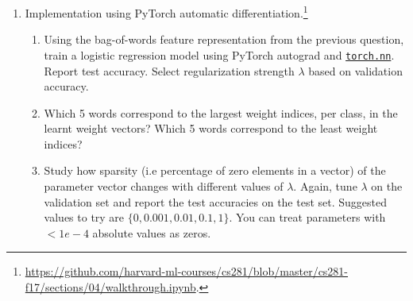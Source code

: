 \begin{problem}
\begin{enumerate}[label=(\alph*)]
    \item Implementation using PyTorch automatic differentiation.\footnote{\url{https://github.com/harvard-ml-courses/cs281/blob/master/cs281-f17/sections/04/walkthrough.ipynb}.}
        \begin{enumerate}[label=(\roman*)]
             \item
               Using the bag-of-words feature representation from the previous question, train a logistic regression model using PyTorch autograd and \href{http://pytorch.org/tutorials/beginner/examples_nn/two_layer_net_nn.html}{\texttt{torch.nn}}. Report test accuracy.
                 Select regularization strength $\lambda$ based on validation accuracy.
             \item Which 5 words correspond to the largest weight indices, per class, in the
                   learnt weight vectors? Which 5 words correspond to the least weight
                   indices?
             \item Study how sparsity (i.e percentage of zero elements in a vector)
                 of the parameter vector changes with different values of $\lambda$.
                 Again, tune $\lambda$ on the validation set and report the test accuracies
                 on the test set. Suggested values to try are $\{0,0.001,0.01,0.1,1\}$. You can treat parameters with $<1e-4$ absolute values as zeros.
         \end{enumerate}

\end{enumerate}

\end{problem}
